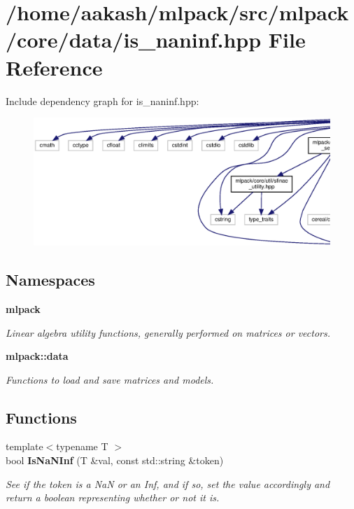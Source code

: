 \section{/home/aakash/mlpack/src/mlpack/core/data/is\+\_\+naninf.hpp File Reference}
\label{is__naninf_8hpp}
Include dependency graph for is\+\_\+naninf.\+hpp\+:
\nopagebreak
\begin{figure}[H]
\begin{center}
\leavevmode
\includegraphics[width=350pt]{is__naninf_8hpp__incl}
\end{center}
\end{figure}
\subsection*{Namespaces}
\begin{DoxyCompactItemize}
\item 
 \textbf{ mlpack}
\begin{DoxyCompactList}\small\item\em Linear algebra utility functions, generally performed on matrices or vectors. \end{DoxyCompactList}\item 
 \textbf{ mlpack\+::data}
\begin{DoxyCompactList}\small\item\em Functions to load and save matrices and models. \end{DoxyCompactList}\end{DoxyCompactItemize}
\subsection*{Functions}
\begin{DoxyCompactItemize}
\item 
{\footnotesize template$<$typename T $>$ }\\bool \textbf{ Is\+Na\+N\+Inf} (T \&val, const std\+::string \&token)
\begin{DoxyCompactList}\small\item\em See if the token is a NaN or an Inf, and if so, set the value accordingly and return a boolean representing whether or not it is. \end{DoxyCompactList}\end{DoxyCompactItemize}


